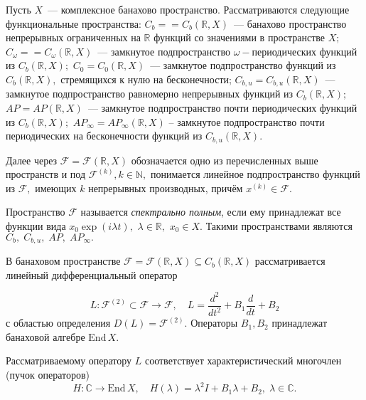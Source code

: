 


\vzmscaption

Пусть $X$~--- комплексное
банахово пространство.
Рассматриваются следующие функциональные пространства:
$C_b=
$\linebreak $=
C_b(\mathbb{R},X)$~--- банахово пространство непрерывных
ограниченных на $\mathbb{R}$ функций со значениями в пространстве $X;$
$C_\omega=
$\linebreak $=
C_\omega(\mathbb{R},X)$~--- замкнутое подпространство $\omega-$периодических фу\-н\-к\-ций из $C_b(\mathbb{R},X);$
$C_0=C_0(\mathbb{R},X)$~--- замкнутое подпространство функций из $C_b(\mathbb{R},X),$ стремящихся к нулю на бесконечности;
$C_{b,u}=C_{b,u}(\mathbb{R},X)$~--- замкнутое подпространство равномерно непрерывных функций из $C_b(\mathbb{R},X);$
$AP=AP(\mathbb{R},X)$~--- замкнутое подпространство почти периодических функций из
$C_b(\mathbb{R},X);$ $AP_{\infty}=AP_{\infty}(\mathbb{R},X)$ -- замкнутое подпространство почти периодических
на бесконечности функций из $C_{b,u}(\mathbb{R},X).$

Далее через $\mathcal{F}=\mathcal{F}(\mathbb{R},X)$ обозначается одно из перечисленных выше пространств
и под $\mathcal{F}^{(k)}, k\in\mathbb{N},$ понимается линейное подпространство функций из $\mathcal{F},$
имеющих $k$ непрерывных производных, причём $x^{(k)}\in \mathcal{F}$.

Пространство $\mathcal{F}$ называется {\it спектрально полным},
если ему принадлежат все функции вида $x_0\exp(i\lambda t),$ $\lambda\in\mathbb{R},$ $x_0 \in X.$
Такими пространствами являются  $C_b,\;C_{b,u},\;AP,\;AP_{\infty}.$

В банаховом пространстве $\mathcal{F}=\mathcal{F}(\mathbb{R}, X)\subseteq C_b (\mathbb{R}, X)$
рассматривается линейный дифференциальный оператор

$$L: \mathcal{F}^{(2)}\subset \mathcal{F}\rightarrow\mathcal{F}, \quad L=\frac {d^2}{dt^2}+B_1\frac {d}{dt}+B_2$$
с областью определения $D(L)=\mathcal{F}^{(2)}.$ Операторы $B_1, B_2$ принадлежат банаховой алгебре $\mathrm{End}\, X.$

Рассматриваемому оператору $L$ соответствует характеристический многочлен (пучок операторов)
$$H:\mathbb{C}\rightarrow \mathrm{End}\,X, \quad H(\lambda)=\lambda^2 I+B_1\lambda+B_2,\;\lambda \in\mathbb{C}.$$

